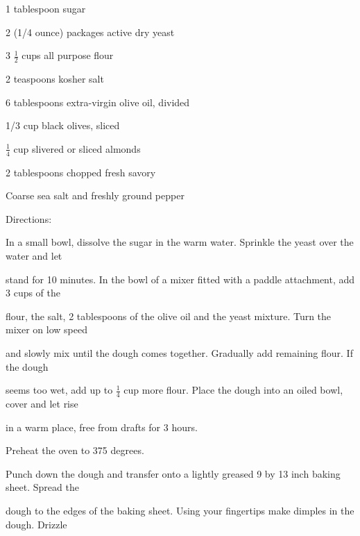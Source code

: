 \documentclass[a4paper,portrait,12pt]{book}
\begin{document}
1 tablespoon sugar




2 (1/4 ounce) packages active dry yeast




3 $\frac{1}{2}$ cups all purpose flour




2 teaspoons kosher salt




6 tablespoons extra-virgin olive oil, divided




1/3 cup black olives, sliced




$\frac{1}{4}$ cup slivered or sliced almonds




2 tablespoons chopped fresh savory




Coarse sea salt and freshly ground pepper




Directions:




In a small bowl, dissolve the sugar in the warm water. Sprinkle the yeast over the water and let




stand for 10 minutes. In the bowl of a mixer fitted with a paddle attachment, add 3 cups of the




flour, the salt, 2 tablespoons of the olive oil and the yeast mixture. Turn the mixer on low speed




and slowly mix until the dough comes together. Gradually add remaining flour. If the dough




seems too wet, add up to $\frac{1}{4}$ cup more flour. Place the dough into an oiled bowl, cover and let rise




in a warm place, free from drafts for 3 hours.




Preheat the oven to 375 degrees.




Punch down the dough and transfer onto a lightly greased 9 by 13 inch baking sheet. Spread the




dough to the edges of the baking sheet. Using your fingertips make dimples in the dough. Drizzle
\end{document}
